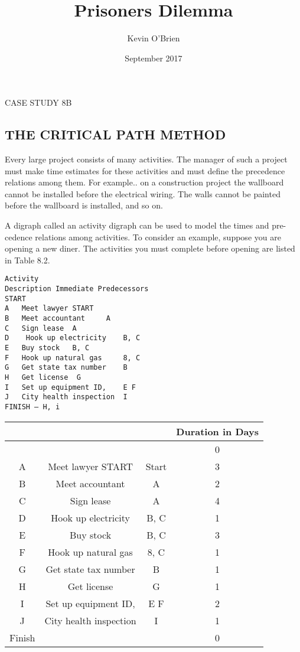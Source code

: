 \documentclass{article}
\title{Prisoners Dilemma}
\author{Kevin O'Brien}
\date{September 2017}
\begin{document}


CASE STUDY 8B 
\subsection{THE CRITICAL PATH METHOD}
Every large project consists of many activities. The manager of such a project must 
make time estimates for these activities and must define the precedence relations 
among them. For example.. on a construction project the wallboard cannot be installed 
before the electrical wiring. The walls cannot be painted before the wallboard is 
installed, and so on. 

A digraph called an activity digraph can be used to model the times and pre-
cedence relations among activities. To consider an example, suppose you are opening 
a new diner. The activities you must complete before opening are listed in Table 8.2. 
\begin{verbatim}
Activity 
Description Immediate Predecessors 
START 
A 	Meet lawyer START 
B 	Meet accountant 	A 
C 	Sign lease 	A 
D	 Hook up electricity 	B, C 
E 	Buy stock 	B, C 
F 	Hook up natural gas 	8, C 
G 	Get state tax number 	B 
H 	Get license	 G 
I 	Set up equipment ID, 	E F 
J 	City health inspection 	I 
FINISH — H, i 
\end{verbatim}

\begin{tabular}{cccc}
	&		&		&	Duration 	in Days 	\\ \hline
	&		&		&	0		\\ \hline
A 	&	Meet lawyer START 	&	Start	&	3		\\ \hline
B 	&	Meet accountant 	&	A 	&	2		\\ \hline
C 	&	Sign lease 	&	A 	&	4		\\ \hline
D	&	 Hook up electricity 	&	B, C 	&	1		\\ \hline
E 	&	Buy stock 	&	B, C 	&	3		\\ \hline
F 	&	Hook up natural gas 	&	8, C 	&	1		\\ \hline
G 	&	Get state tax number 	&	B 	&	1		\\ \hline
H 	&	Get license	&	 G 	&	1		\\ \hline
I 	&	Set up equipment ID, 	&	E F 	&	2		\\ \hline
J 	&	City health inspection 	&	I 	&	1		\\ \hline
Finish	&		&		&	0		\\ \hline
\end{tabular}
\end{document}

